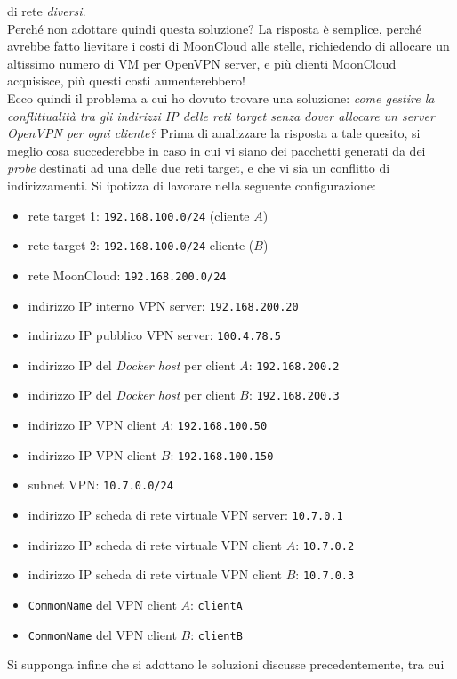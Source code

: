 di rete \textit{diversi}.\\
Perché non adottare quindi questa soluzione? La risposta è semplice, perché avrebbe
fatto lievitare i costi di MoonCloud alle stelle, richiedendo di allocare un altissimo
numero di VM per OpenVPN server, e più clienti MoonCloud acquisisce, più questi
costi aumenterebbero!\\
Ecco quindi il problema a cui ho dovuto trovare una soluzione: \textit{come gestire
la conflittualità tra gli indirizzi IP delle reti target senza dover allocare un
server OpenVPN per ogni cliente?}
Prima di analizzare la risposta a tale quesito, si meglio cosa succederebbe in caso in cui
vi siano dei pacchetti generati da dei \textit{probe} destinati ad una delle due reti target,
e che vi
sia un conflitto di indirizzamenti. Si ipotizza di lavorare nella seguente
configurazione:
\begin{itemize}
  \item rete target 1: \texttt{192.168.100.0/24} (cliente $A$)
  \item rete target 2: \texttt{192.168.100.0/24} cliente ($B$)
  \item rete MoonCloud: \texttt{192.168.200.0/24}
  \item indirizzo IP interno VPN server: \texttt{192.168.200.20}
  \item indirizzo IP pubblico VPN server: \texttt{100.4.78.5}
  \item indirizzo IP del \textit{Docker host} per client $A$: \texttt{192.168.200.2}
  \item indirizzo IP del \textit{Docker host} per client $B$: \texttt{192.168.200.3}
  \item indirizzo IP VPN client $A$: \texttt{192.168.100.50}
  \item indirizzo IP VPN client $B$: \texttt{192.168.100.150}
  \item subnet VPN: \texttt{10.7.0.0/24}
  \item indirizzo IP scheda di rete virtuale VPN server: \texttt{10.7.0.1}
  \item indirizzo IP scheda di rete virtuale VPN client $A$: \texttt{10.7.0.2}
  \item indirizzo IP scheda di rete virtuale VPN client $B$: \texttt{10.7.0.3}
  \item \texttt{CommonName} del VPN client $A$: \texttt{clientA}
  \item \texttt{CommonName} del VPN client $B$: \texttt{clientB}
\end{itemize}
Si supponga infine che si adottano le soluzioni discusse precedentemente, tra cui
